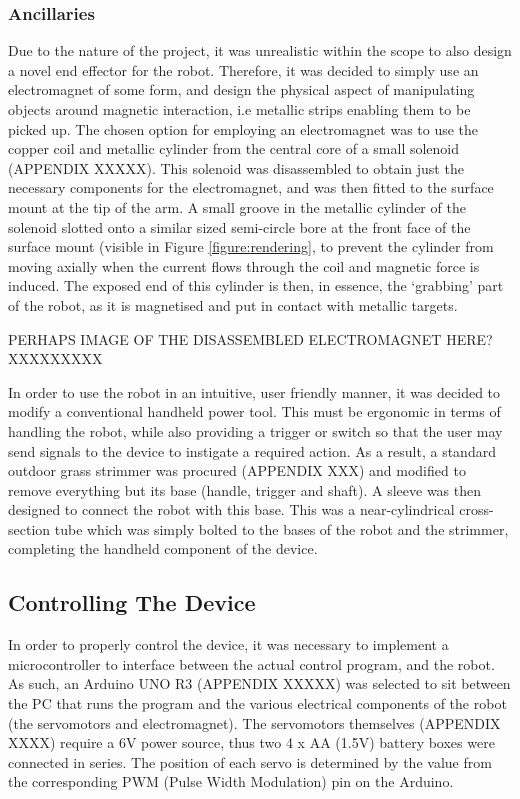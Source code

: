 \documentclass[11pt]{article}
\begin{document}
\subsubsection{Ancillaries}
Due to the nature of the project, it was unrealistic within the scope to also design a novel end effector for the robot. Therefore, it was decided to simply use an electromagnet of some form, and design the physical aspect of manipulating objects around magnetic interaction, i.e metallic strips enabling them to be picked up. The chosen option for employing an electromagnet was to use the copper coil and metallic cylinder from the central core of a small solenoid (APPENDIX XXXXX). This solenoid was disassembled to obtain just the necessary components for the electromagnet, and was then fitted to the surface mount at the tip of the arm. A small groove in the metallic cylinder of the solenoid slotted onto a similar sized semi-circle bore at the front face of the surface mount (visible in Figure \ref{figure:rendering}, to prevent the cylinder from moving axially when the current flows through the coil and magnetic force is induced. The exposed end of this cylinder is then, in essence, the `grabbing' part of the robot, as it is magnetised and put in contact with metallic targets.

PERHAPS IMAGE OF THE DISASSEMBLED ELECTROMAGNET HERE? XXXXXXXXX

In order to use the robot in an intuitive, user friendly manner, it was decided to modify a conventional handheld power tool. This must be ergonomic in terms of handling the robot, while also providing a trigger or switch so that the user may send signals to the device to instigate a required action. As a result, a standard outdoor grass strimmer was procured (APPENDIX XXX) and modified to remove everything but its base (handle, trigger and shaft). A sleeve was then designed to connect the robot with this base. This was a near-cylindrical cross-section tube which was simply bolted to the bases of the robot and the strimmer, completing the handheld component of the device.


\pagebreak
\subsection{Controlling The Device}

In order to properly control the device, it was necessary to implement a microcontroller to interface between the actual control program, and the robot. As such, an Arduino UNO R3 (APPENDIX XXXXX) was selected to sit between the PC that runs the program and the various electrical components of the robot (the servomotors and electromagnet). The servomotors themselves (APPENDIX XXXX) require a 6V power source, thus two 4 x AA (1.5V) battery boxes were connected in series. The position of each servo is determined by the value from the corresponding PWM (Pulse Width Modulation) pin on the Arduino. 
\end{document}
